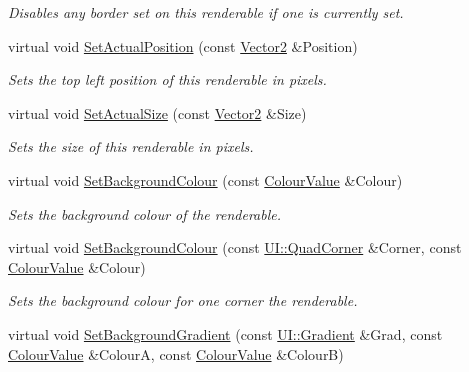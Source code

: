 \begin{DoxyCompactItemize}
\begin{DoxyCompactList}\small\item\em Disables any border set on this renderable if one is currently set. \item\end{DoxyCompactList}\item 
virtual void \hyperlink{classMezzanine_1_1UI_1_1Rectangle_ae0fa331126efedd6517a0a7775bdbbcb}{SetActualPosition} (const \hyperlink{classMezzanine_1_1Vector2}{Vector2} \&Position)
\begin{DoxyCompactList}\small\item\em Sets the top left position of this renderable in pixels. \item\end{DoxyCompactList}\item 
virtual void \hyperlink{classMezzanine_1_1UI_1_1Rectangle_afa29e6cc6d4a180d2b4a718a237aa274}{SetActualSize} (const \hyperlink{classMezzanine_1_1Vector2}{Vector2} \&Size)
\begin{DoxyCompactList}\small\item\em Sets the size of this renderable in pixels. \item\end{DoxyCompactList}\item 
virtual void \hyperlink{classMezzanine_1_1UI_1_1Rectangle_a11a3444ba78ad8c8f6303ccc73543c4b}{SetBackgroundColour} (const \hyperlink{classMezzanine_1_1ColourValue}{ColourValue} \&Colour)
\begin{DoxyCompactList}\small\item\em Sets the background colour of the renderable. \item\end{DoxyCompactList}\item 
virtual void \hyperlink{classMezzanine_1_1UI_1_1Rectangle_a84a84444478426d12e92a6b573d0b403}{SetBackgroundColour} (const \hyperlink{namespaceMezzanine_1_1UI_a61a42a62e4838bc93b194886a363fe36}{UI::QuadCorner} \&Corner, const \hyperlink{classMezzanine_1_1ColourValue}{ColourValue} \&Colour)
\begin{DoxyCompactList}\small\item\em Sets the background colour for one corner the renderable. \item\end{DoxyCompactList}\item 
virtual void \hyperlink{classMezzanine_1_1UI_1_1Rectangle_a0540906339a6827ca1e8bf52482c44aa}{SetBackgroundGradient} (const \hyperlink{namespaceMezzanine_1_1UI_a694cd1781f4196f8c391c9147cd41e8e}{UI::Gradient} \&Grad, const \hyperlink{classMezzanine_1_1ColourValue}{ColourValue} \&ColourA, const \hyperlink{classMezzanine_1_1ColourValue}{ColourValue} \&ColourB)

\end{DoxyCompactItemize}
